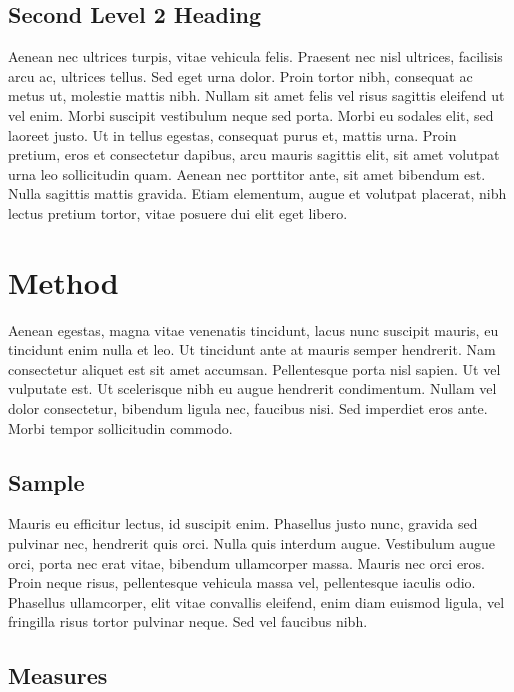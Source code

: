 \documentclass[
    colorlinks=true,        %
    linkcolor=black,          %
    anchorcolor=black,      %
    citecolor=black,         %
    urlcolor=black,          %
    bookmarks=true,         %
    bookmarksopen=false,    %
    bookmarksnumbered=true,  %
    dvipsnames
]{MAE}
\begin{document}
\subsection{Second Level 2 Heading}

Aenean nec ultrices turpis, vitae vehicula felis. Praesent nec nisl ultrices, facilisis arcu ac, ultrices tellus. Sed eget urna dolor. Proin tortor nibh, consequat ac metus ut, molestie mattis nibh. Nullam sit amet felis vel risus sagittis eleifend ut vel enim. Morbi suscipit vestibulum neque sed porta. Morbi eu sodales elit, sed laoreet justo. Ut in tellus egestas, consequat purus et, mattis urna. Proin pretium, eros et consectetur dapibus, arcu mauris sagittis elit, sit amet volutpat urna leo sollicitudin quam. Aenean nec porttitor ante, sit amet bibendum est. Nulla sagittis mattis gravida. Etiam elementum, augue et volutpat placerat, nibh lectus pretium tortor, vitae posuere dui elit eget libero.

\section{Method}
\label{sec:3}

Aenean egestas, magna vitae venenatis tincidunt, lacus nunc suscipit mauris, eu tincidunt enim nulla et leo. Ut tincidunt ante at mauris semper hendrerit. Nam consectetur aliquet est sit amet accumsan. Pellentesque porta nisl sapien. Ut vel vulputate est. Ut scelerisque nibh eu augue hendrerit condimentum. Nullam vel dolor consectetur, bibendum ligula nec, faucibus nisi. Sed imperdiet eros ante. Morbi tempor sollicitudin commodo.

\subsection{Sample}

Mauris eu efficitur lectus, id suscipit enim. Phasellus justo nunc, gravida sed pulvinar nec, hendrerit quis orci. Nulla quis interdum augue. Vestibulum augue orci, porta nec erat vitae, bibendum ullamcorper massa. Mauris nec orci eros. Proin neque risus, pellentesque vehicula massa vel, pellentesque iaculis odio. Phasellus ullamcorper, elit vitae convallis eleifend, enim diam euismod ligula, vel fringilla risus tortor pulvinar neque. Sed vel faucibus nibh.

\subsection{Measures}
\end{document}
